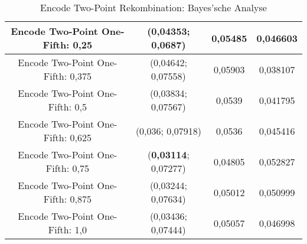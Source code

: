 \begin{table}[H]
\begin{tabular}{c | c | c | c}
		\hline
		Encode Two-Point One-Fifth: 0,25 & \color{Green}(0,04353; 0,0687)\color{black} & 0,05485 & 0,046603\\
		\hline
		Encode Two-Point One-Fifth: 0,375 & \color{Green}(0,04642; 0,07558)\color{black} & 0,05903 & 0,038107\\
		\hline
		Encode Two-Point One-Fifth: 0,5 & (0,03834; 0,07567) & 0,0539 & 0,041795\\
		\hline
		Encode Two-Point One-Fifth: 0,625 & (0,036; 0,07918) & 0,0536 & 0,045416\\
		\hline
		Encode Two-Point One-Fifth: 0,75 & (\textbf{0,03114}; 0,07277) & 0,04805 & \color{Green}0,052827\color{black}\\
		\hline
		Encode Two-Point One-Fifth: 0,875 & (0,03244; 0,07634) & 0,05012 & 0,050999\\
		\hline
		Encode Two-Point One-Fifth: 1,0 & (0,03436; 0,07444) & 0,05057 & 0,046998\\
	\end{tabular}
	\caption{Encode Two-Point Rekombination: Bayes'sche Analyse}
	\label{table:encodeTwoPointBayesian}
\end{table}

